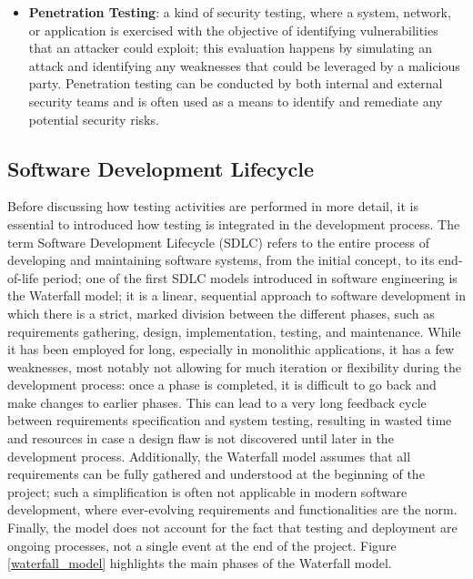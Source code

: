 \begin{itemize}
    \item \textbf{Penetration Testing}: a kind of security testing, where a system, network, or application is exercised with the objective of identifying vulnerabilities that an attacker could exploit; this evaluation happens by simulating an attack and identifying any weaknesses that could be leveraged by a malicious party. Penetration testing can be conducted by both internal and external security teams and is often used as a means to identify and remediate any potential security risks.
\end{itemize}



\subsection{Software Development Lifecycle}
Before discussing how testing activities are performed in more detail, it is essential to introduced how testing is integrated in the development process. The term Software Development Lifecycle (SDLC) refers to the entire process of developing and maintaining software systems, from the initial concept, to its end-of-life period; one of the first SDLC models introduced in software engineering is the Waterfall model; it is a linear, sequential approach to software development in which there is a strict, marked division between the different phases, such as requirements gathering, design, implementation, testing, and maintenance. While it has been employed for long, especially in monolithic applications, it has a few weaknesses, most notably not allowing for much iteration or flexibility during the development process: once a phase is completed, it is difficult to go back and make changes to earlier phases. This can lead to a very long feedback cycle between requirements specification and system testing, resulting in wasted time and resources in case a design flaw is not discovered until later in the development process. Additionally, the Waterfall model assumes that all requirements can be fully gathered and understood at the beginning of the project; such a simplification is often not applicable in modern software development, where ever-evolving requirements and functionalities are the norm. 
Finally, the model does not account for the fact that testing and deployment are ongoing processes, not a single event at the end of the project.
Figure \ref{waterfall_model} highlights the main phases of the Waterfall model.

